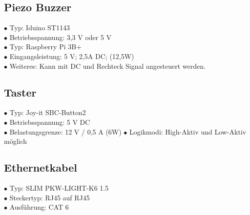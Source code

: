 \documentclass[12pt,a4paper,openany]{scrbook}
\begin{document}
	
	\subsection{Piezo Buzzer}
	$\bullet$ Typ: Iduino ST1143\\ 
	$\bullet$ Betriebsspannung: 3,3 V oder 5 V \\
	$\bullet$ Typ: Raspberry Pi 3B+\\ 
	$\bullet$ Eingangsleistung: 5 V; 2,5A DC; (12,5W) \\
	$\bullet$ Weiteres: Kann mit DC und Rechteck Signal angesteuert werden.
	
	\subsection{Taster}  
		$\bullet$ Typ: Joy-it SBC-Button2\\ 
		$\bullet$ Betriebsspannung: 5 V DC\\
		$\bullet$ Belastungsgrenze: 12 V / 0,5 A (6W)
		$\bullet$ Logikmodi: High-Aktiv und Low-Aktiv möglich
	
	\subsection{Ethernetkabel}
	$\bullet$ Typ:   SLIM PKW-LIGHT-K6 1.5\\ 
	$\bullet$ Steckertyp: RJ45 auf RJ45\\ 
	$\bullet$ Ausführung: CAT 6\\ 
	
	
\end{document}
